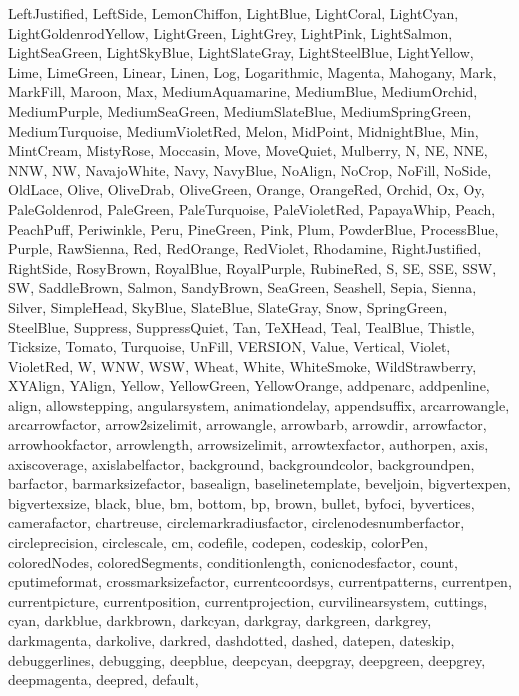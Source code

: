 {{  LeftJustified, LeftSide, LemonChiffon, LightBlue, LightCoral, LightCyan,
  LightGoldenrodYellow, LightGreen, LightGrey, LightPink, LightSalmon,
  LightSeaGreen, LightSkyBlue, LightSlateGray, LightSteelBlue, LightYellow,
  Lime, LimeGreen, Linear, Linen, Log, Logarithmic, Magenta, Mahogany, Mark,
  MarkFill, Maroon, Max, MediumAquamarine, MediumBlue, MediumOrchid,
  MediumPurple, MediumSeaGreen, MediumSlateBlue, MediumSpringGreen,
  MediumTurquoise, MediumVioletRed, Melon, MidPoint, MidnightBlue, Min,
  MintCream, MistyRose, Moccasin, Move, MoveQuiet, Mulberry, N, NE, NNE, NNW,
  NW, NavajoWhite, Navy, NavyBlue, NoAlign, NoCrop, NoFill, NoSide, OldLace,
  Olive, OliveDrab, OliveGreen, Orange, OrangeRed, Orchid, Ox, Oy,
  PaleGoldenrod, PaleGreen, PaleTurquoise, PaleVioletRed, PapayaWhip, Peach,
  PeachPuff, Periwinkle, Peru, PineGreen, Pink, Plum, PowderBlue, ProcessBlue,
  Purple, RawSienna, Red, RedOrange, RedViolet, Rhodamine, RightJustified,
  RightSide, RosyBrown, RoyalBlue, RoyalPurple, RubineRed, S, SE, SSE, SSW, SW,
  SaddleBrown, Salmon, SandyBrown, SeaGreen, Seashell, Sepia, Sienna, Silver,
  SimpleHead, SkyBlue, SlateBlue, SlateGray, Snow, SpringGreen, SteelBlue,
  Suppress, SuppressQuiet, Tan, TeXHead, Teal, TealBlue, Thistle, Ticksize,
  Tomato, Turquoise, UnFill, VERSION, Value, Vertical, Violet, VioletRed, W,
  WNW, WSW, Wheat, White, WhiteSmoke, WildStrawberry, XYAlign, YAlign, Yellow,
  YellowGreen, YellowOrange, addpenarc, addpenline, align, allowstepping,
  angularsystem, animationdelay, appendsuffix, arcarrowangle, arcarrowfactor,
  arrow2sizelimit, arrowangle, arrowbarb, arrowdir, arrowfactor,
  arrowhookfactor, arrowlength, arrowsizelimit, arrowtexfactor, authorpen,
  axis, axiscoverage, axislabelfactor, background, backgroundcolor,
  backgroundpen, barfactor, barmarksizefactor, basealign, baselinetemplate,
  beveljoin, bigvertexpen, bigvertexsize, black, blue, bm, bottom, bp, brown,
  bullet, byfoci, byvertices, camerafactor, chartreuse, circlemarkradiusfactor,
  circlenodesnumberfactor, circleprecision, circlescale, cm, codefile, codepen,
  codeskip, colorPen, coloredNodes, coloredSegments, conditionlength,
  conicnodesfactor, count, cputimeformat, crossmarksizefactor, currentcoordsys,
  currentpatterns, currentpen, currentpicture, currentposition,
  currentprojection, curvilinearsystem, cuttings, cyan, darkblue, darkbrown,
  darkcyan, darkgray, darkgreen, darkgrey, darkmagenta, darkolive, darkred,
  dashdotted, dashed, datepen, dateskip, debuggerlines, debugging, deepblue,
  deepcyan, deepgray, deepgreen, deepgrey, deepmagenta, deepred, default,
}}
